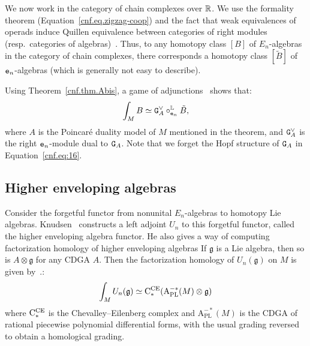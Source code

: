 We now work in the category of chain complexes over $\mathbb{R}$.
We use the formality theorem (Equation~\eqref{cnf.eq.zigzag-coop}) and the fact that weak equivalences of operads induce Quillen equivalence between categories of right modules (resp.\ categories of algebras)~\cite[Theorems 16.A and 16.B]{Fresse2009}.
Thus, to any homotopy class $[B]$ of $E_{n}$-algebras in the category of chain complexes, there corresponds a homotopy class $[\tilde{B}]$ of $\mathtt{e}_{n}$-algebras (which is generally not easy to describe).

Using Theorem~\ref{cnf.thm.Abis}, a game of adjunctions~\cite[Theorems 15.1.A and 15.2.A]{Fresse2009} shows that:
\begin{equation}
  \label{cnf.eq:16}
  \int_{M} B \simeq \mathtt{G}_{A}^{\vee} \circ_{\mathtt{e}_{n}}^{\mathbb{L}} \tilde{B},
\end{equation}
where $A$ is the Poincaré duality model of $M$ mentioned in the theorem, and $\mathtt{G}_{A}^{\vee}$ is the right $\mathtt{e}_{n}$-module dual to $\mathtt{G}_{A}$.
Note that we forget the Hopf structure of $\mathtt{G}_{A}$ in Equation~\ref{cnf.eq:16}.


\subsection{Higher enveloping algebras}
\label{cnf.sec.high-envel-algebr}

Consider the forgetful functor from nonunital $E_{n}$-algebras to homotopy Lie algebras.
Knudsen~\cite[Theorem A]{Knudsen2016} constructs a left adjoint $U_{n}$ to this forgetful functor, called the higher enveloping algebra functor.
He also gives a way of computing factorization homology of higher enveloping algebras
If $\mathfrak{g}$ is a Lie algebra, then so is $A \otimes \mathfrak{g}$ for any CDGA $A$.
Then the factorization homology of $U_{n}(\mathfrak{g})$ on $M$ is given by~\cite[Theorem 3.16]{Knudsen2017}.:
\begin{equation}
  \label{cnf.eq.thm-knudsen}
  \int_{M} U_{n}(\mathfrak{g}) \simeq \mathrm{C}_{*}^{\mathrm{CE}}(\mathrm{A}^{-*}_{\mathrm{PL}}(M) \otimes \mathfrak{g})
\end{equation}
where $\mathrm{C}_{*}^{\mathrm{CE}}$ is the Chevalley--Eilenberg complex and $\mathrm{A}^{-*}_{\mathrm{PL}}(M)$ is the CDGA of rational piecewise polynomial differential forms, with the usual grading reversed to obtain a homological grading.

